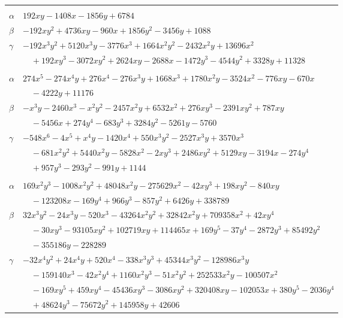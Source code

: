 \documentclass[11pt]{article}
\begin{document}
\begin{longtable}{@{}ll@{}}
\addlinespace[3pt]
\multicolumn{2}{@{}l}{$\{i,j\}=\{26,107\}$, $k_{ij}=2^{15}$}\\
$\alpha$ & $192xy-1408x-1856y+6784$\\
$\beta$ & $-192xy^{2}+4736xy-960x+1856y^{2}-3456y+1088$\\
$\gamma$ & $-192x^{3}y^{2}+5120x^{3}y-3776x^{3}+1664x^{2}y^{2}-2432x^{2}y+13696x^{2}$\\
 & $\quad +192xy^{3}-3072xy^{2}+2624xy-2688x-1472y^{3}-4544y^{2}+3328y+11328$\\
\addlinespace[3pt]
\multicolumn{2}{@{}l}{$\{i,j\}=\{26,121\}$, $k_{ij}=2^{11}\cdot 13$}\\
$\alpha$ & $274x^{5}-274x^{4}y+276x^{4}-276x^{3}y+1668x^{3}+1780x^{2}y-3524x^{2}-776xy-670x$\\
 & $\quad -4222y+11176$\\
$\beta$ & $-x^{3}y-2460x^{3}-x^{2}y^{2}-2457x^{2}y+6532x^{2}+276xy^{3}-2391xy^{2}+787xy$\\
 & $\quad -5456x+274y^{4}-683y^{3}+3284y^{2}-5261y-5760$\\
$\gamma$ & $-548x^{6}-4x^{5}+x^{4}y-1420x^{4}+550x^{3}y^{2}-2527x^{3}y+3570x^{3}$\\
 & $\quad -681x^{2}y^{2}+5440x^{2}y-5828x^{2}-2xy^{3}+2486xy^{2}+5129xy-3194x-274y^{4}$\\
 & $\quad +957y^{3}-293y^{2}-991y+1144$\\
\addlinespace[3pt]
\multicolumn{2}{@{}l}{$\{i,j\}=\{26,164\}$, $k_{ij}=2^{13}\cdot 7\cdot 13$}\\
$\alpha$ & $169x^{2}y^{3}-1008x^{2}y^{2}+48048x^{2}y-275629x^{2}-42xy^{3}+198xy^{2}-840xy$\\
 & $\quad -123208x-169y^{4}+966y^{3}-857y^{2}+6426y+338789$\\
$\beta$ & $32x^{3}y^{2}-24x^{3}y-520x^{3}-43264x^{2}y^{2}+32842x^{2}y+709358x^{2}+42xy^{4}$\\
 & $\quad -30xy^{3}-93105xy^{2}+102719xy+114465x+169y^{5}-37y^{4}-2872y^{3}+85492y^{2}$\\
 & $\quad -355186y-228289$\\
$\gamma$ & $-32x^{4}y^{2}+24x^{4}y+520x^{4}-338x^{3}y^{3}+45344x^{3}y^{2}-128986x^{3}y$\\
 & $\quad -159140x^{3}-42x^{2}y^{4}+1160x^{2}y^{3}-51x^{2}y^{2}+252533x^{2}y-100507x^{2}$\\
 & $\quad -169xy^{5}+459xy^{4}-45436xy^{3}-3086xy^{2}+320408xy-102053x+380y^{5}-2036y^{4}$\\
 & $\quad +48624y^{3}-75672y^{2}+145958y+42606$\\

\end{longtable}
\end{document}
